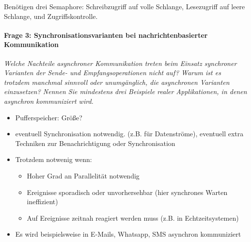 \documentclass[a4paper]{article}
\begin{document}
Benötigen drei Semaphore: Schreibzugriff auf volle Schlange, Lesezugriff auf leere Schlange, und Zugriffskontrolle.

\vspace{10mm}
\paragraph{Frage 3: Synchronisationsvarianten bei nachrichtenbasierter Kommunikation}
\textit{Welche Nachteile asynchroner Kommunikation treten beim Einsatz synchroner Varianten der Sende- und Empfangsoperationen nicht auf? Warum ist es trotzdem manchmal sinnvoll oder unumgänglich, die asynchronen Varianten einzusetzen? Nennen Sie mindestens drei Beispiele realer Applikationen, in denen asynchron kommuniziert wird.}
\begin{itemize}
        \item Pufferspeicher: Größe?
        \item eventuell Synchronisation notwendig. (z.B. für Datenströme), eventuell extra Techniken zur Benachrichtigung oder Synchronisation
    \item Trotzdem notwenig wenn:
          \begin{itemize}
              \item Hoher Grad an Parallelität notwendig
              \item Ereignisse sporadisch oder unvorhersehbar (hier synchrones Warten ineffizient)
              \item Auf Ereignisse zeitnah reagiert werden muss (z.B. in Echtzeitsystemen)
          \end{itemize}
    \item Es wird beispielsweise in E-Mails, Whatsapp, SMS asynchron kommuniziert
\end{itemize}

\vspace{10mm}
\end{document}
